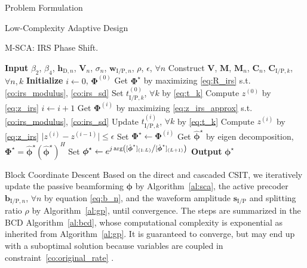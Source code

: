 \documentclass[journal]{IEEEtran}
\begin{document}
\begin{section}{Problem Formulation}
\begin{subsection}{Low-Complexity Adaptive Design}
			\begin{algorithm}[!t]
				\caption{M-SCA: IRS Phase Shift.}
				\label{al:m_sca}
				\begin{algorithmic}[1]
					\State \textbf{Input} $\beta_2$, $\beta_4$, $\boldsymbol{h}_{\mathrm{D},n}$, $\boldsymbol{V}_{n}$, $\sigma_n$, $\boldsymbol{w}_{\mathrm{I/P},n}$, $\rho$, $\epsilon$, $\forall n$
					\State Construct $\boldsymbol{V}$, $\boldsymbol{M}$, $\boldsymbol{M}_n$, $\boldsymbol{C}_{n}$, $\boldsymbol{C}_{\mathrm{I/P},k}$, $\forall n,k$
					\State \textbf{Initialize} $i \gets 0$, $\boldsymbol{\Phi}^{(0)}$
						\State Get $\boldsymbol{\Phi}^{\star}$ by maximizing \eqref{eq:R_irs} s.t. \eqref{co:irs_modulus}, \eqref{co:irs_sd}
					\Else
						\State Set $t_{\mathrm{I/P},k}^{(0)}$, $\forall k$ by \eqref{eq:t_k}
						\State Compute $z^{(0)}$ by \eqref{eq:z_irs}
						\Repeat
							\State $i \gets i + 1$
								\State Get $\boldsymbol{\Phi}^{(i)}$ by maximizing \eqref{eq:z_irs_approx} s.t. \eqref{co:irs_modulus}, \eqref{co:irs_sd}
								\State Update $t_{\mathrm{I/P},k}^{(i)}$, $\forall k$ by \eqref{eq:t_k}
								\State Compute $z^{(i)}$ by \eqref{eq:z_irs}
						\Until $\lvert z^{(i)}-z^{(i-1)} \rvert \le \epsilon$
						\State Set $\boldsymbol{\Phi}^{\star} \gets \boldsymbol{\Phi}^{(i)}$
					\EndIf
					\State Get $\hat{\boldsymbol{\phi}}^\star$ by eigen decomposition, $\boldsymbol{\Phi}^{\star}=\hat{\boldsymbol{\phi}}^\star(\hat{\boldsymbol{\phi}}^\star)^H$
					\State Set $\boldsymbol{\phi}^{\star} \gets e^{j \arg\left([\hat{\boldsymbol{\phi}}^\star]_{(1:L)} \middle/ [\hat{\boldsymbol{\phi}}^\star]_{(L+1)}\right)}$
					\State \textbf{Output} $\boldsymbol{\phi}^{\star}$
				\end{algorithmic}
			\end{algorithm}
		\end{subsection}


		\begin{subsection}{Block Coordinate Descent}
			Based on the direct and cascaded CSIT, we iteratively update the passive beamforming $\boldsymbol{\phi}$ by Algorithm~\ref{al:sca}, the active precoder $\boldsymbol{b}_{\mathrm{I/P},n}$, $\forall n$ by equation \eqref{eq:b_n}, and the waveform amplitude $\boldsymbol{s}_{\mathrm{I/P}}$ and splitting ratio $\rho$ by Algorithm~\ref{al:gp}, until convergence. The steps are summarized in the BCD Algorithm~\ref{al:bcd}, whose computational complexity is exponential as inherited from Algorithm~\ref{al:gp}. It is guaranteed to converge, but may end up with a suboptimal solution because variables are coupled in constraint~\eqref{co:original_rate} \cite{Grippo2000}.


\end{subsection}
\end{section}
\end{document}
